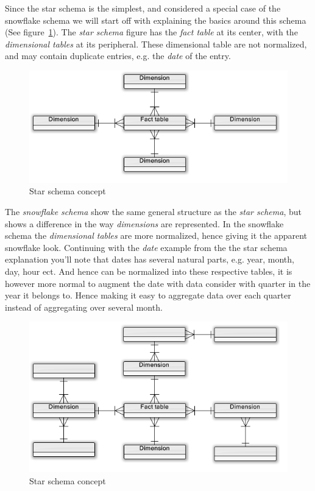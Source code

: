 	\bigskip\noindent
	Since the star schema is the simplest, and considered a special case of the snowflake schema
	we will start off with explaining the basics around this schema (See figure~\ref{fig:starSchemeConcept}). 
	The \textit{star schema} figure has the \textit{fact table} at its center, with the \textit{dimensional tables} at its peripheral. 
	These dimensional table are not normalized, and may contain duplicate entries, e.g. the \textit{date} of the entry.
		
	\begin{figure}[H]%
		\centering
		\includegraphics[width=0.5\columnwidth]{UML/StarSchemaConcept.png}%
		\caption{Star schema concept}%
		\label{fig:starSchemeConcept}%
	\end{figure}
	
	\bigskip\noindent
	The \textit{snowflake schema} show the same general structure as the \textit{star schema}, 
	but shows a difference in the way \textit{dimensions} are represented. 
	In the snowflake schema the \textit{dimensional tables} are more normalized, hence giving it the apparent snowflake look.
	Continuing with the \textit{date}	example from the the star schema explanation you'll note that dates has several natural 
	parts, e.g. year, month, day, hour ect. And hence can be normalized into these respective tables, 
	it is however more normal to augment the date with data consider with quarter in the year it belongs to. 
	Hence making it easy to aggregate data over each quarter instead of aggregating over several month.
	
	\begin{figure}[H]%
		\centering
		\includegraphics[width=0.5\columnwidth]{UML/SnowflakeSchemaConcept.png}%
		\caption{Star schema concept}%
		\label{fig:snowflakeSchemeConcept}%
	\end{figure}	
	

